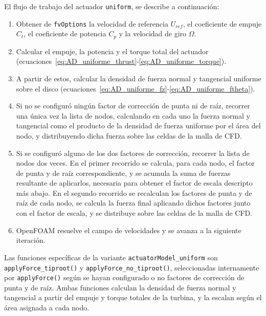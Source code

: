 El flujo de trabajo del actuador \texttt{uniform}, se describe a continuación:
\begin{enumerate}
\item Obtener de \texttt{fvOptions} la velocidad de referencia $U_{ref}$, el coeficiente de empuje $C_t$, el coeficiente de potencia $C_p$ y la velocidad de giro $\Omega$.
\item Calcular el empuje, la potencia y el torque total del actuador (ecuaciones~\ref{eq:AD_uniforme_thrust}-\ref{eq:AD_uniforme_torque}).
\item A partir de estos, calcular la densidad de fuerza normal y tangencial uniforme sobre el disco (ecuaciones~\ref{eq:AD_uniforme_fz}-\ref{eq:AD_uniforme_ftheta}).
\item Si no se configuró ningún factor de corrección de punta ni de raíz, recorrer una única vez la lista de nodos, calculando en cada uno la fuerza normal y tangencial como el producto de la densidad de fuerza uniforme por el área del nodo, y distribuyendo dicha fuerza sobre las celdas de la malla de CFD.
\item Si se configuró alguno de los dos factores de corrección, recorrer la lista de nodos dos veces. En el primer recorrido se calcula, para cada nodo, el factor de punta y de raíz correspondiente, y se acumula la suma de fuerzas resultante de aplicarlos, necesaria para obtener el factor de escala descripto más abajo. En el segundo recorrido se recalculan los factores de punta y de raíz de cada nodo, se calcula la fuerza final aplicando dichos factores junto con el factor de escala, y se distribuye sobre las celdas de la malla de CFD.
\item OpenFOAM resuelve el campo de velocidades y se avanza a la siguiente iteración.
\end{enumerate}

Las funciones específicas de la variante \texttt{actuatorModel\_uniform} son \texttt{applyForce\_tiproot()} y \texttt{applyForce\_no\_tiproot()}, seleccionadas internamente por \texttt{applyForce()} según se hayan configurado o no factores de corrección de punta y de raíz. Ambas funciones calculan la densidad de fuerza normal y tangencial a partir del empuje y torque totales de la turbina, y la escalan según el área asignada a cada nodo.

